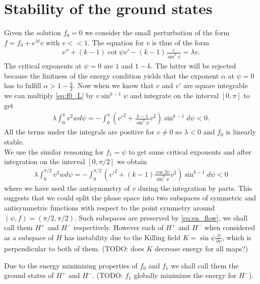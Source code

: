 \section*{Stability of the ground states}

Given the solution $f_0=0$ we consider the small perturbation of the
form $f=f_0+e^{\lambda t} v$ with $v<<1$. The equation for $v$ is thus
of the form
\begin{align}\label{eq:f0_L}
  v''+(k-1)\cot\psi v'-(k-1)\frac{v}{\sin^2\psi}=\lambda v.
\end{align}
The critical exponents at $\psi=0$ are $1$ and $1-k$. The latter will
be rejected because the finitness of the energy condition yields that
the exponent $\alpha$ at $\psi=0$ has to fulfill
$\alpha>1-\frac{k}{2}$. Now when we know that $v$ and $v'$ are square
integrable we can multiply \eqref{eq:f0_L} by $v\sin^{k-1}\psi$ and
integrate on the interval $[0,\pi]$ to get
\begin{align}
  \lambda\int_0^\pi v^2w d\psi=-\int_0^\pi\left(v'^2+\frac{k-1}{\sin^2\psi}v^2\right)\sin^{k-1}d\psi<0.
\end{align}
All the terms under the integrals are positive for $v\ne0$ so
$\lambda<0$ and $f_0$ is linearly stable.\\

We use the similar reasoning for $f_1=\psi$ to get same critical
exponents and after integration on the interval $[0,\pi/2]$ we obtain
\begin{align}
  \label{eq:f1_lambda}
  \lambda\int_0^{\pi/2} v^2w d\psi=-\int_0^{\pi/2}\left(v'^2+(k-1)\frac{\cos2\psi}{\sin^2\psi}v^2\right)\sin^{k-1}d\psi<0
\end{align}
where we have used the antisymmetry of $v$ during the integration by
parts. This suggests that we could split the phase space into two
subspaces of symmetric and antisymmetric functions with respect to the
point symmetry around $(\psi,f)=(\pi/2,\pi/2)$. Such subspaces are
preserved by \eqref{eq:en_flow}, we shall call them $H^+$ and $H^-$
respectively. However each of $H^+$ and $H^-$ when considered as a
subspace of $H$ has instability due to the Killing field
$K=\sin\psi\frac{\partial}{\partial\psi}$, which is perpendicular to
both of them. (TODO: does $K$ decrease energy for all maps?)

Due to the energy minimizing properties of $f_0$ and $f_1$ we shall
call them the ground states of $H^+$ and $H^-$. (TODO: $f_1$ globally
minimizes the energy for $H^-$).


